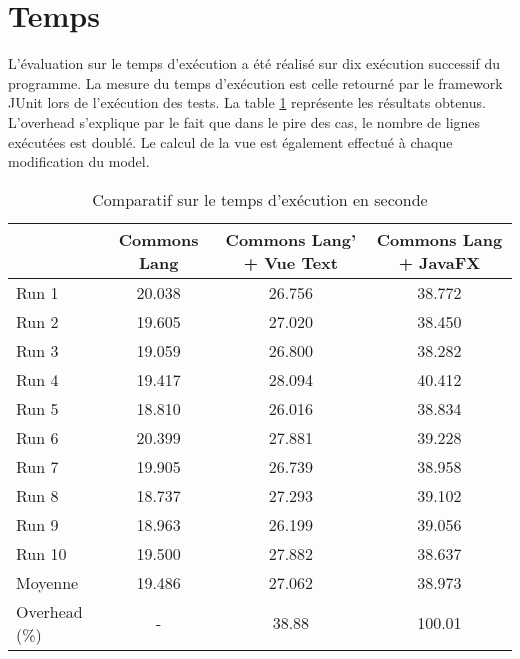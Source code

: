 \section{Temps}
\label{temps}

L'évaluation sur le temps d'exécution a été réalisé sur dix exécution successif du programme. La mesure du temps d'exécution est celle retourné par le framework JUnit lors de l'exécution des tests. La table \ref{evaluation_temps} représente les résultats obtenus. L'overhead s'explique par le fait que dans le pire des cas, le nombre de lignes exécutées est doublé. Le calcul de la vue est également effectué à chaque modification du model.

\begin{table}[H]
\centering
\begin{tabular}{|l|c|c|c|}
\hline
         & Commons Lang & Commons Lang' + Vue Text & Commons Lang + JavaFX\\
         \hline
Run 1     & 20.038  & 26.756       & 38.772        \\
Run 2     & 19.605  & 27.020       & 38.450        \\
Run 3     & 19.059  & 26.800       & 38.282        \\
Run 4     & 19.417  & 28.094       & 40.412        \\
Run 5     & 18.810  & 26.016       & 38.834        \\
Run 6     & 20.399  & 27.881       & 39.228        \\
Run 7     & 19.905  & 26.739       & 38.958        \\
Run 8     & 18.737  & 27.293       & 39.102        \\
Run 9     & 18.963  & 26.199       & 39.056        \\
Run 10    & 19.500  & 27.882       & 38.637        \\
\hline
Moyenne  & 19.486  & 27.062       & 38.973        \\
\hline
Overhead (\%) & -  & 38.88       & 100.01   \\
\hline    
\end{tabular}
\caption{Comparatif sur le temps d'exécution en seconde}
\label{evaluation_temps}
\end{table}
